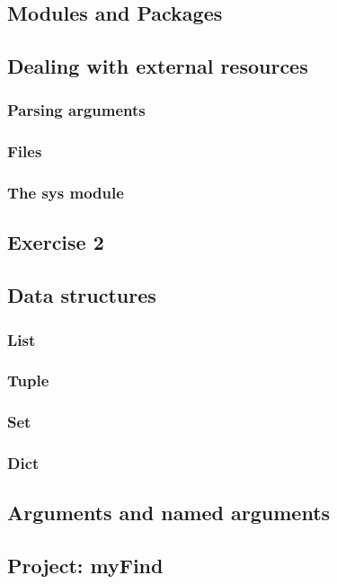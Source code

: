 \subsection{Modules and Packages}

\subsection{Dealing with external resources}
\subsubsection{Parsing arguments}
\subsubsection{Files}
\subsubsection{The sys module}

\subsection{Exercise 2}

\subsection{Data structures}
\subsubsection{List}
\subsubsection{Tuple}
\subsubsection{Set}
\subsubsection{Dict}

\subsection{Arguments and named arguments}

\subsection{Project: myFind}
